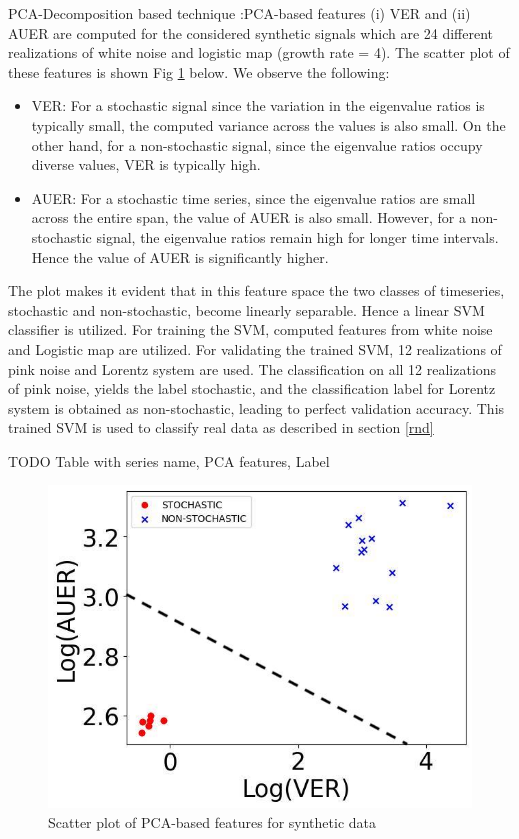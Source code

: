 \documentclass[journal]{IEEEtran}
\begin{document}
		PCA-Decomposition based technique :PCA-based features (i) VER and (ii) AUER  are computed for the considered synthetic signals which are 24 different realizations of white noise and logistic map (growth rate = 4). The scatter plot of these features is shown Fig \ref{scatterplot} below. We observe the following:
	\begin{itemize}
		\item VER: For a stochastic signal since the variation in the eigenvalue ratios is typically small, the computed variance across the values is also small. On the other hand, for a non-stochastic signal, since the eigenvalue ratios occupy diverse values, VER is typically high.
		\item AUER: For a stochastic time series, since the eigenvalue ratios  are small across the entire span, the value of AUER is also small. However, for a non-stochastic signal, the eigenvalue ratios remain high for longer time intervals. Hence the value of AUER is significantly higher.
	\end{itemize}


	The plot makes it evident that in this feature space the two classes of timeseries, stochastic and non-stochastic, become linearly separable. Hence a linear SVM classifier is utilized. For training the SVM, computed features from white noise and Logistic map are utilized. For validating the trained SVM, 12 realizations of pink noise and Lorentz system are used. The classification on all 12 realizations of pink noise, yields the label stochastic, and the classification label for Lorentz system is obtained as non-stochastic, leading to perfect validation accuracy. This trained SVM is used to classify real data as described in section \ref{rnd}
	
	TODO Table with series name, PCA features, Label 
	\begin{figure}[h]
		\centering
		\includegraphics[width=0.8\linewidth]{Scatterplot_poc_variance_area_threshold_7.jpg}
		\caption{Scatter plot of PCA-based features for synthetic data}
		\label{scatterplot}
	\end{figure}
	
\end{document}
